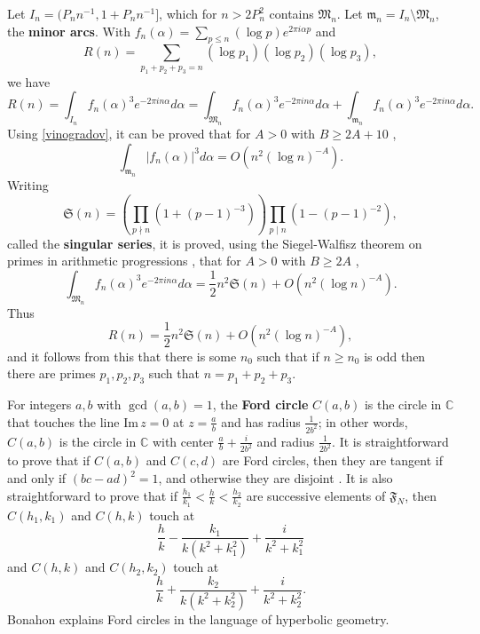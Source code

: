 \documentclass{amsart}
\def\Im{\ensuremath{\mathrm{Im}}\,}
\begin{document}
Let $I_n = (P_nn^{-1},1+P_nn^{-1}]$, which
for $n>2P_n^2$
 contains  $\mathfrak{M}_n$. Let $\mathfrak{m}_n=I_n \setminus \mathfrak{M}_n$, the \textbf{minor arcs}. 
With $f_n(\alpha) = \sum_{p \leq n} (\log p) e^{2\pi i\alpha p}$ and 
\[
R(n) = \sum_{p_1+p_2+p_3=n} (\log p_1) (\log p_2) (\log p_3),
\]
we have
\[
R(n)=\int_{I_n} f_n(\alpha)^3 e^{-2\pi in\alpha} d\alpha
=\int_{\mathfrak{M}_n}  f_n(\alpha)^3 e^{-2\pi in\alpha} d\alpha
+\int_{\mathfrak{m}_n}  f_n(\alpha)^3 e^{-2\pi in\alpha} d\alpha.
\]
Using \eqref{vinogradov}, it can be proved that for $A>0$ with $B \geq 2A+10$ \cite[p.~29, Theorem 3.2]{vaughan},
\[
\int_{\mathfrak{m}_n} |f_n(\alpha)|^3 d\alpha = O(n^2 (\log n)^{-A}).
\]
Writing 
\[
\mathfrak{S}(n) = \left( \prod_{p \nmid n} (1+(p-1)^{-3}) \right) \prod_{p \mid n} (1-(p-1)^{-2}),
\]
called the \textbf{singular series}, it is proved, using the Siegel-Walfisz theorem on primes in arithmetic progressions \cite[p.~381, Corollary
11.19]{multiplicative}, that 
for $A>0$ with $B \geq 2A$ \cite[p.~31, Theorem 3.3]{vaughan},
\[
\int_{\mathfrak{M}_n} f_n(\alpha)^3 e^{-2\pi in\alpha} d\alpha = \frac{1}{2} n^2 \mathfrak{S}(n) + O(n^2(\log n)^{-A}).
\]
Thus
\[
R(n) = \frac{1}{2} n^2 \mathfrak{S}(n) + O(n^2(\log n)^{-A}),
\]
and it follows from this  that there is some $n_0$ such that if $n \geq n_0$ is odd then there are primes
$p_1,p_2,p_3$ such that $n=p_1+p_2+p_3$. 

For integers $a,b$ with $\gcd(a,b)=1$, the \textbf{Ford circle} $C(a,b)$ is the circle in $\mathbb{C}$ 
that touches the line $\Im z=0$ at $z=\frac{a}{b}$ and has radius $\frac{1}{2b^2}$; in other words, $C(a,b)$ is the circle in $\mathbb{C}$
with center $\frac{a}{b}+\frac{i}{2b^2}$ and radius
$\frac{1}{2b^2}$.
It is straightforward to prove that if $C(a,b)$ and $C(c,d)$ are Ford circles, then they are tangent if and only if $(bc-ad)^2=1$, and
otherwise they are disjoint \cite[p.~100, Theorem 5.6]{apostol}. It is also straightforward to prove \cite[p.~101, Theorem 5.7]{apostol} that if 
$\frac{h_1}{k_1} < \frac{h}{k} < \frac{h_2}{k_2}$ are successive elements of $\mathfrak{F}_N$, then 
$C(h_1,k_1)$ and $C(h,k)$ touch at
\[
\frac{h}{k} - \frac{k_1}{k(k^2+k_1^2)} + \frac{i}{k^2+k_1^2}
\]
and  $C(h,k)$ and $C(h_2,k_2)$ touch at
\[
\frac{h}{k} + \frac{k_2}{k(k^2+k_2^2)} + \frac{i}{k^2+k_2^2}.
\]
Bonahon \cite[pp.~207 ff., Chapter 8]{bonahon} explains Ford circles in the language of hyperbolic geometry.
\end{document}

